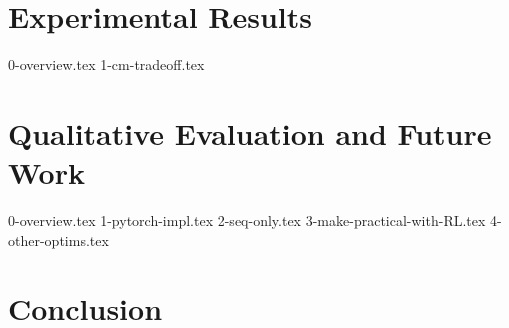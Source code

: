 \documentclass[12pt,twoside]{report}
\begin{document}
\chapter{Experimental Results}
{0-overview.tex}
{1-cm-tradeoff.tex}

\chapter{Qualitative Evaluation and Future Work}
{0-overview.tex}
{1-pytorch-impl.tex}
{2-seq-only.tex}
{3-make-practical-with-RL.tex}
{4-other-optims.tex}

\chapter{Conclusion}



\end{document}
